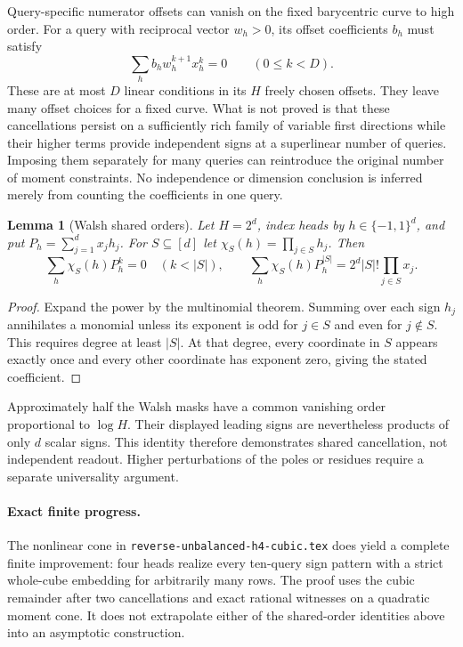\documentclass[11pt]{article}
\newtheorem{lemma}{Lemma}
\begin{document}
Query-specific numerator offsets can vanish on the fixed barycentric
curve to high order. For a query with reciprocal vector $w_h>0$, its
offset coefficients $b_h$ must satisfy
\[
 \sum_h b_hw_h^{k+1}x_h^k=0\qquad(0\leq k<D).
\]
These are at most $D$ linear conditions in its $H$ freely chosen
offsets. They leave many offset choices for a fixed curve. What is
not proved is that these cancellations persist on a sufficiently rich
family of variable first directions while their higher terms provide
independent signs at a superlinear number of queries. Imposing them
separately for many queries can reintroduce the original number of
moment constraints. No independence or dimension conclusion is inferred
merely from counting the coefficients in one query.

\begin{lemma}[Walsh shared orders]
Let $H=2^d$, index heads by $h\in\{-1,1\}^d$, and put
$P_h=\sum_{j=1}^d x_jh_j$. For $S\subseteq[d]$ let
$\chi_S(h)=\prod_{j\in S}h_j$. Then
\[
 \sum_h\chi_S(h)P_h^k=0\quad(k<|S|),\qquad
 \sum_h\chi_S(h)P_h^{|S|}
 =2^d|S|!\prod_{j\in S}x_j.
\]
\end{lemma}
\begin{proof}
Expand the power by the multinomial theorem. Summing over each sign
$h_j$ annihilates a monomial unless its exponent is odd for $j\in S$
and even for $j\notin S$. This requires degree at least $|S|$. At
that degree, every coordinate in $S$ appears exactly once and every
other coordinate has exponent zero, giving the stated coefficient.
\end{proof}

Approximately half the Walsh masks have a common vanishing order
proportional to $\log H$. Their displayed leading signs are nevertheless
products of only $d$ scalar signs. This identity therefore demonstrates
shared cancellation, not independent readout. Higher perturbations of
the poles or residues require a separate universality argument.

\paragraph{Exact finite progress.}
The nonlinear cone in
\texttt{reverse-unbalanced-h4-cubic.tex} does yield a complete finite
improvement: four heads realize every ten-query sign pattern with a
strict whole-cube embedding for arbitrarily many rows. The proof uses
the cubic remainder after two cancellations and exact rational witnesses
on a quadratic moment cone. It does not extrapolate either of the
shared-order identities above into an asymptotic construction.
\end{document}
